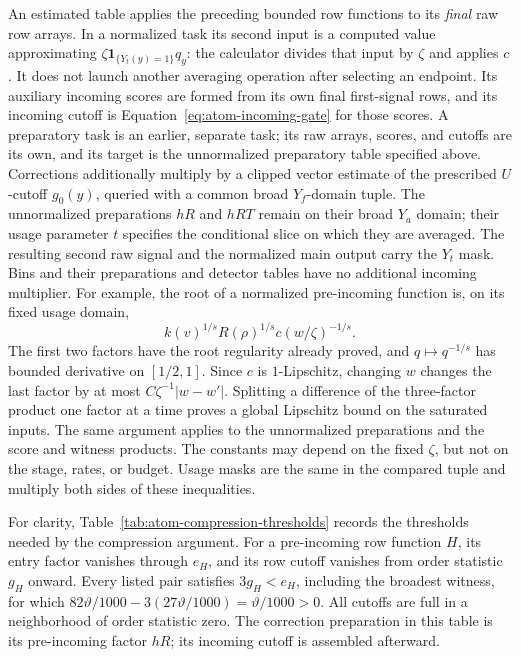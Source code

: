 An estimated table applies the preceding bounded row functions to its
\emph{final} raw row arrays.  In a normalized task its second input is a
computed value approximating $\zeta\mathbf1_{\{Y_t(y)=1\}}q_y$: the
calculator divides that input by $\zeta$ and applies $c$.  It does not launch another averaging
operation after selecting an endpoint.  Its auxiliary incoming scores
are formed from its own final first-signal rows, and its incoming cutoff
is Equation~\eqref{eq:atom-incoming-gate} for those scores.  A preparatory
task is an earlier, separate task; its raw arrays, scores, and cutoffs are
its own, and its target is the unnormalized preparatory table specified
above.  Corrections additionally multiply by a clipped vector estimate
of the prescribed $U$-cutoff $g_0(y)$, queried with a common broad
$Y_f$-domain tuple.  The unnormalized preparations $hR$ and $hRT$
remain on their broad $Y_a$ domain; their usage parameter $t$ specifies
the conditional slice on which they are averaged.  The resulting
second raw signal and the normalized main output carry the $Y_t$ mask.
Bins and their preparations and detector tables have
no additional incoming multiplier.
For example, the root of a normalized pre-incoming function is,
on its fixed usage domain,
\[
 k(v)^{1/s}R(\rho)^{1/s}c(w/\zeta)^{-1/s}.
\]
The first two factors have the root regularity already proved, and
$q\mapsto q^{-1/s}$ has bounded derivative on $[1/2,1]$.
Since $c$ is $1$-Lipschitz, changing $w$ changes the last factor
by at most $C\zeta^{-1}|w-w'|$. Splitting a difference of the
three-factor product one factor at a time proves a global Lipschitz
bound on the saturated inputs. The same argument applies to the
unnormalized preparations and the score and witness products.
The constants may depend on the fixed $\zeta$, but not on the stage,
rates, or budget. Usage masks are the same in the compared tuple
and multiply both sides of these inequalities.

For clarity, Table~\ref{tab:atom-compression-thresholds} records the
thresholds needed by the compression argument.  For a pre-incoming row
function $H$, its entry factor vanishes through $e_H$, and its row cutoff
vanishes from order statistic $g_H$ onward.  Every listed pair satisfies
$3g_H<e_H$, including the broadest witness, for which
$82\vartheta/1000-3(27\vartheta/1000)=\vartheta/1000>0$.
All cutoffs are full in a neighborhood of order statistic zero.  The correction
preparation in this table is its pre-incoming factor $hR$; its incoming
cutoff is assembled afterward.

